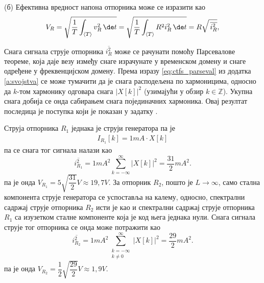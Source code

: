 (б) Ефективна вредност напона отпорника може се изразити као 
\begin{eqnarray}
    V_R = \sqrt{ \dfrac{1}{T} \int_{\langle T \rangle} v_R^2  \, \de t  }
        = \sqrt{ \dfrac{1}{T} \int_{\langle T \rangle} R^2 i_R^2  \, \de t  }
        = R \sqrt{ \, \overline{i_R^2} },
\end{eqnarray}

Снага сигнала струје отпорника $\overline{i_R^2}$ може се рачунати помоћу Парсевалове теореме, која даје везу између снаге 
израчунате у временском домену и снаге одређене у фреквенцијском домену. Према изразу \ref{eq:ctfs_parseval} из додатка 
\ref{a:svojstva} се може тумачити да је снага расподељена по хармоницима, односно да $k$-том хармонику одговара 
снага $|X[k]|^2$ (узимајући у обзир $k \in \mathbb Z$). Укупна снага добија се онда сабирањем снага појединачних хармоника. 
Овај резултат последица је поступка који је показан у задатку
.

Струја
отпорника $R_1$ једнака је струји генератора па је 
\begin{eqnarray}
    I_{R_1}[k] = 1\unit{mA} \cdot X[k]
\end{eqnarray}
па се снага тог сигнала налази као 
\begin{equation}
    \overline{i_{R_1}^2} = 1 \unit{mA^2} \sum_{k = -\infty}^{\infty} |X[k]|^2 = \dfrac{31}{2} \unit{mA^2}.
\end{equation}
па је онда $V_{R_1} = 5 \sqrt{\dfrac{31}{2}} \unit{V} \approx 19,7 \unit{V}$. За отпорник $R_2$, пошто је $L \to \infty$, само 
стална компонента струје генератора се успоставља на калему, односно, спектрални садржај струје отпорника 
$R_2$ исти је као и спектрални садржај струје отпорника $R_1$ са изузетком сталне компоненте која је код 
њега једнака нули. Снага сигнала струје тог отпорника се онда може потражити као
\begin{equation}
    \overline{i_{R_2}^2} = 1 \unit{mA^2} \sum_{ \substack{k = -\infty\\k\neq 0}}^{\infty} |X[k]|^2 = \dfrac{29}{2} \unit{mA^2}.
\end{equation}
па је онда $V_{R_2} = \dfrac{1}{2} \sqrt{ \dfrac{29}{2} } \unit{V} \approx 1,9 \unit{V}$.